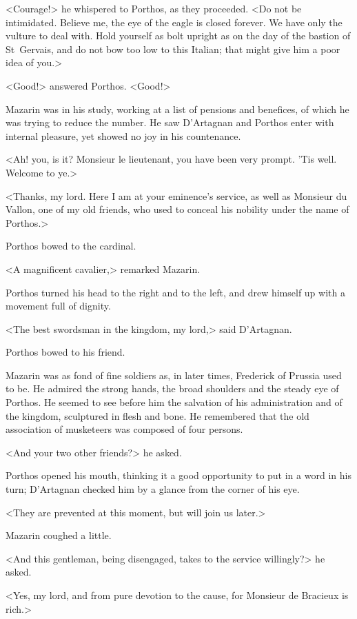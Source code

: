 <Courage!> he whispered to Porthos, as they proceeded. <Do not be intimidated. Believe me, the eye of the eagle is closed forever. We have only the vulture to deal with. Hold yourself as bolt upright as on the day of the bastion of St~Gervais, and do not bow too low to this Italian; that might give him a poor idea of you.>

<Good!> answered Porthos. <Good!>

Mazarin was in his study, working at a list of pensions and benefices, of which he was trying to reduce the number. He saw D'Artagnan and Porthos enter with internal pleasure, yet showed no joy in his countenance.

<Ah! you, is it? Monsieur le lieutenant, you have been very prompt. 'Tis well. Welcome to ye.>

<Thanks, my lord. Here I am at your eminence's service, as well as Monsieur du Vallon, one of my old friends, who used to conceal his nobility under the name of Porthos.>

Porthos bowed to the cardinal.

<A magnificent cavalier,> remarked Mazarin.

Porthos turned his head to the right and to the left, and drew himself up with a movement full of dignity.

<The best swordsman in the kingdom, my lord,> said D'Artagnan.

Porthos bowed to his friend.

Mazarin was as fond of fine soldiers as, in later times, Frederick of Prussia used to be. He admired the strong hands, the broad shoulders and the steady eye of Porthos. He seemed to see before him the salvation of his administration and of the kingdom, sculptured in flesh and bone. He remembered that the old association of musketeers was composed of four persons.

<And your two other friends?> he asked.

Porthos opened his mouth, thinking it a good opportunity to put in a word in his turn; D'Artagnan checked him by a glance from the corner of his eye.

<They are prevented at this moment, but will join us later.>

Mazarin coughed a little.

<And this gentleman, being disengaged, takes to the service willingly?> he asked.

<Yes, my lord, and from pure devotion to the cause, for Monsieur de Bracieux is rich.>

